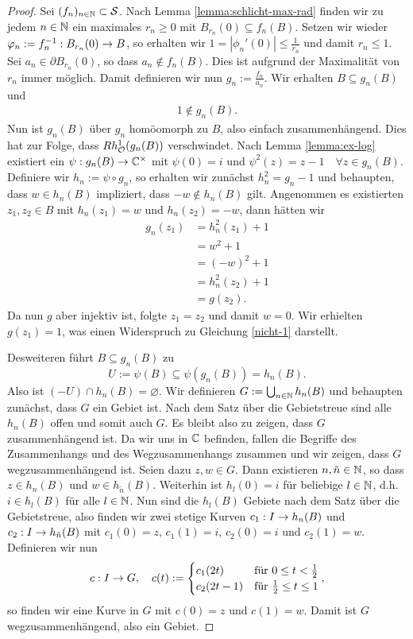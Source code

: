 \begin{proof}
  Sei $(f_n)_{n \in \mathbb{N}} \subset \mathcal{S}$.
  Nach Lemma \ref{lemma:schlicht-max-rad}  finden wir zu jedem $n \in \mathbb{N}$
  ein maximales $r_n \geq 0$ mit $B_{r_n}(0) \subseteq f_n(B)$. Setzen wir
  wieder $\varphi_n:=f_n^{-1} : B_{r_n}(0) \rightarrow B$, so erhalten wir $1 =
  |\phi_n'(0)| \leq \frac{1}{r_n}$ und damit $r_n \leq 1$. 
  Sei $a_n \in \partial B_{r_n}(0)$, so dass $a_n \notin f_n(B)$. Dies ist
  aufgrund der Maximalität von $r_n$ immer möglich. Damit definieren
  wir nun $g_n := \frac{f_n}{a_n}$. Wir erhalten $B \subseteq g_n(B)$
  und
  \begin{align}
  1 \notin g_n(B). \label{nicht-1}
  \end{align}
  Nun ist $g_n(B)$ über $g_n$ homöomorph zu $B$, also einfach
  zusammenhängend. Dies hat zur Folge, dass $Rh_{\mathcal{O}}^1(g_n(B))$
  verschwindet. 
  Nach Lemma \ref{lemma:ex-log} existiert ein $\psi: g_n(B) \rightarrow \mathbb{C}^\times$ mit
  $\psi(0) = i$ und $\psi^2(z) = z - 1 \quad \forall z \in g_n(B)$.
  Definiere wir $h_n := \psi \circ g_n$, so erhalten wir zunächst
  $h_n^2 = g_n - 1$ und behaupten, dass $w \in h_n(B)$ impliziert,
  dass $-w \notin h_n(B)$ gilt.
  Angenommen es existierten $z_1,z_2 \in B$ mit $h_n(z_1) = w$ und
  $h_n(z_2) = -w$, dann hätten wir
  \begin{align*}
    g_n(z_1) & = h_n^2(z_1) +1 \\
    & = w^2 +1 \\
    & = (-w)^2 +1 \\
    & = h_n^2(z_2) +1 \\
    & = g(z_2).
  \end{align*}
  Da nun $g$ aber injektiv ist, folgte $z_1 = z_2$ und damit $w =
  0$. Wir erhielten $g(z_1) = 1$, was einen Widerspruch zu Gleichung
  \eqref{nicht-1} darstellt. 

  Desweiteren führt $B \subseteq g_n(B)$ zu
  \[
  U:= \psi(B) \subseteq \psi(g_n(B)) = h_n(B).
  \]
  Also ist $(-U) \cap h_n(B) = \varnothing$.
  Wir definieren $G := \bigcup_{n \in \mathbb{N}} h_n(B)$ und behaupten
  zunächst, dass $G$ ein Gebiet ist.
  Nach dem Satz über die Gebietstreue sind alle $h_n(B)$ offen und
  somit auch $G$. Es bleibt also zu zeigen, dass $G$ zusammenhängend
  ist. Da wir uns in $\mathbb{C}$ befinden, fallen die Begriffe des
  Zusammenhangs und des Wegzusammenhangs zusammen und wir zeigen, dass
  $G$ wegzusammenhängend ist.
  Seien dazu $z, w \in G$. Dann existieren $n, \tilde n \in \mathbb{N}$, so
  dass $z \in h_n(B)$ und $w \in h_{\tilde n} (B)$. Weiterhin ist
  $h_l(0) = i$ für beliebige $l \in \mathbb{N}$, d.h. $i \in h_l(B)$ für alle
  $l \in \mathbb{N}$. Nun sind die $h_l(B)$ Gebiete nach dem Satz über
  die Gebietstreue, also finden wir zwei stetige Kurven $c_1: I \rightarrow
  h_n(B)$ und $c_2: I \rightarrow h_{\tilde n}(B)$ mit $c_1(0) = z$, $c_1(1) =
  i$, $c_2(0) = i$ und $c_2(1) = w$. Definieren wir nun
  \[
  c: I \rightarrow G, \quad c(t) :=
  \begin{cases}
    c_1(2t) & \text{für } 0 \leq t < \frac12\\
    c_2(2t-1) & \text{für } \frac12 \leq t \leq 1
  \end{cases},
  \]
  so finden wir eine Kurve in $G$ mit $c(0) = z$ und $c(1) = w$. Damit
  ist $G$ wegzusammenhängend, also ein Gebiet.


\end{proof}
